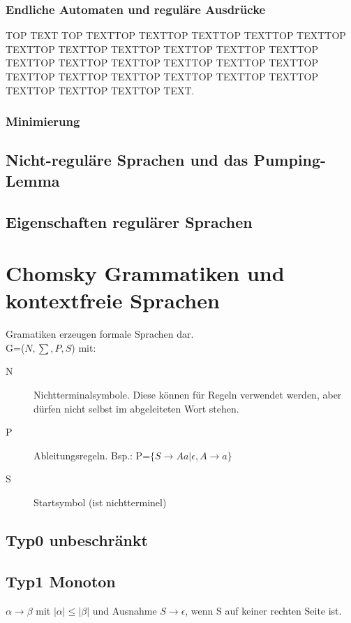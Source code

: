 \documentclass[12pt,a4paper]{article}
\begin{document}
\subsubsection{Endliche Automaten und reguläre Ausdrücke}
TOP TEXT TOP TEXTTOP TEXTTOP TEXTTOP TEXTTOP TEXTTOP TEXTTOP TEXTTOP TEXTTOP TEXTTOP TEXTTOP TEXTTOP TEXTTOP TEXTTOP TEXTTOP TEXTTOP TEXTTOP TEXTTOP TEXTTOP TEXTTOP TEXTTOP TEXTTOP TEXTTOP TEXTTOP TEXTTOP TEXTTOP TEXTTOP TEXT.

\subsubsection{Minimierung}

\subsection{Nicht-reguläre Sprachen und das Pumping-Lemma}

\subsection{Eigenschaften regulärer Sprachen}

\section{Chomsky Grammatiken und kontextfreie Sprachen}
	Gramatiken erzeugen formale Sprachen dar.\\
	G=($N, \sum , P, S$) mit:\\
	\begin{description}
		\item[N] Nichtterminalsymbole. Diese können für Regeln verwendet werden, aber dürfen nicht selbst im abgeleiteten Wort stehen.
		\item[P] Ableitungsregeln. Bsp.: P=$\{ S \rightarrow Aa | \epsilon , A \rightarrow a \} $ 
		\item[S] Startsymbol (ist nichtterminel)
	\end{description}

	\subsection{Typ0 unbeschränkt}
    \subsection{Typ1 Monoton}
      $\alpha \rightarrow \beta$ mit $| \alpha | \leq  | \beta |$ und Ausnahme $S \rightarrow \epsilon$, wenn S auf keiner rechten Seite ist.
\end{document}
